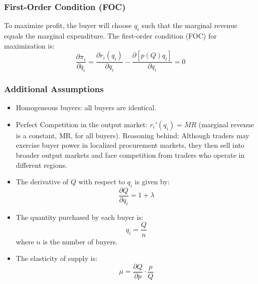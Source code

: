 \documentclass[12pt]{article}
\begin{document}
\subsubsection{First-Order Condition (FOC)}
To maximize profit, the buyer will choose \( q_i \) such that the marginal revenue equals the marginal expenditure. The first-order condition (FOC) for maximization is:
\begin{equation}
\frac{\partial \pi_i}{\partial q_i} = \frac{\partial r_i(q_i)}{\partial q_i} - \frac{\partial [p(Q) q_i]}{\partial q_i} = 0
\end{equation}

\subsubsection{Additional Assumptions}
\begin{itemize}
  \item Homogeneous buyers: all buyers are identical.
  \item Perfect Competition in the output market: \( r_i'(q_i) = MR \) (marginal revenue is a constant, MR, for all buyers). Reasoning behind: Although traders may exercise buyer power in localized procurement markets, they then sell into broader output markets and face competition from traders who operate in different regions.
  \item The derivative of \( Q \) with respect to \( q_i \) is given by:
    \begin{equation}
    \frac{\partial Q}{\partial q_i} = 1 + \lambda
    \end{equation}
  \item The quantity purchased by each buyer is:
    \begin{equation}
    q_i = \frac{Q}{n}
    \end{equation}
    where \( n \) is the number of buyers.
  \item The elasticity of supply is:
    \begin{equation}
    \mu = \frac{\partial Q}{\partial p} \cdot \frac{p}{Q}
    \end{equation}
\end{itemize}
\end{document}
